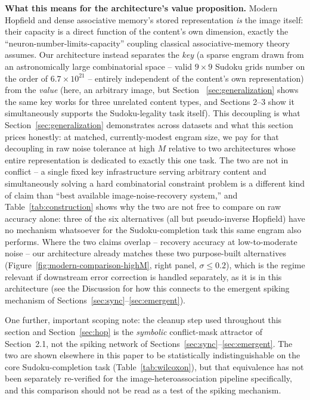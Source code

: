 \documentclass[11pt]{article}
\begin{document}
\textbf{What this means for the architecture's value proposition.} Modern Hopfield and dense
associative memory's stored representation \emph{is} the image itself: their capacity is a
direct function of the content's own dimension, exactly the ``neuron-number-limits-capacity''
coupling classical associative-memory theory assumes. Our architecture instead separates the
\emph{key} (a sparse engram drawn from an astronomically large combinatorial space -- valid
$9\times9$ Sudoku grids number on the order of $6.7\times10^{21}$ -- entirely independent of
the content's own representation) from the \emph{value} (here, an arbitrary image, but Section~
\ref{sec:generalization} shows the same key works for three unrelated content types, and
Sections 2--3 show it simultaneously supports the Sudoku-legality task itself). This decoupling
is what Section~\ref{sec:generalization} demonstrates across datasets and what this section
prices honestly: at matched, currently-modest engram size, we pay for that decoupling in raw
noise tolerance at high $M$ relative to two architectures whose entire representation is
dedicated to exactly this one task. The two are not in conflict -- a single fixed key
infrastructure serving arbitrary content and simultaneously solving a hard combinatorial
constraint problem is a different kind of claim than ``best available image-noise-recovery
system,'' and Table~\ref{tab:construction} shows why the two are not free to compare on raw
accuracy alone: three of the six alternatives (all but pseudo-inverse Hopfield) have no
mechanism whatsoever for the Sudoku-completion task this same engram also performs. Where the
two claims overlap -- recovery accuracy at low-to-moderate noise -- our architecture already
matches these two purpose-built alternatives (Figure~\ref{fig:modern-comparison-highM}, right
panel, $\sigma{\leq}0.2$), which is the regime relevant if downstream error correction is
handled separately, as it is in this architecture (see the Discussion for how this connects to
the emergent spiking mechanism of Sections~\ref{sec:sync}--\ref{sec:emergent}).

One further, important scoping note: the cleanup step used throughout this section and
Section~\ref{sec:hop} is the \emph{symbolic} conflict-mask attractor of Section~2.1, not the
spiking network of Sections~\ref{sec:sync}--\ref{sec:emergent}. The two are shown elsewhere in
this paper to be statistically indistinguishable on the core Sudoku-completion task
(Table~\ref{tab:wilcoxon}), but that equivalence has not been separately re-verified for the
image-heteroassociation pipeline specifically, and this comparison should not be read as a test
of the spiking mechanism.
\end{document}
